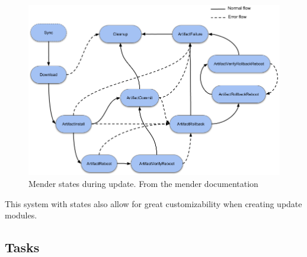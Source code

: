\documentclass[../../main.tex]{subfiles}
\begin{document}
\begin{figure}[h]
\begin{center}
	\includegraphics[width=\textwidth]{img/update-modules-state-machine.png}
\end{center}
\caption{Mender states during update. From the mender documentation\cite{mender-docs}}%
\label{fig:mender-states}
\end{figure}

This system with states also allow for great customizability when creating update modules.



\subsection{Tasks}%
\label{sub:tasks}
\end{document}
